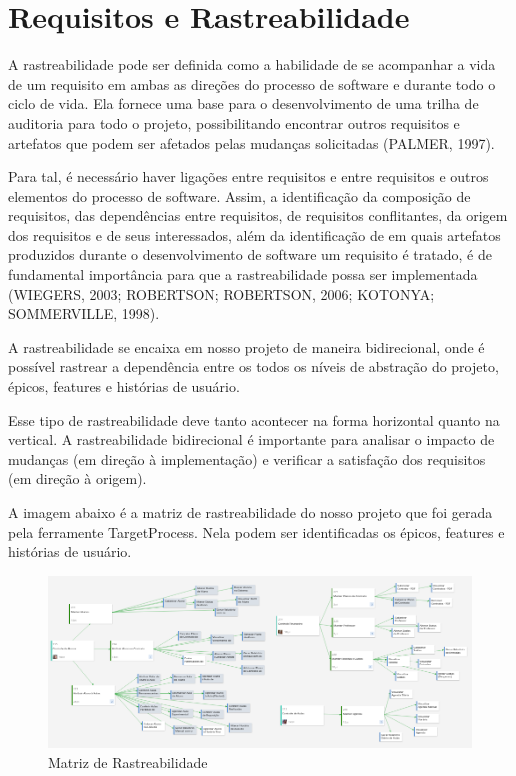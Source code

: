 \section[Requisitos e Rastreabilidade]{Requisitos e Rastreabilidade}
A rastreabilidade pode ser definida como a habilidade de se acompanhar a vida
de um requisito em ambas as direções do processo de software e durante todo o ciclo de
vida. Ela fornece uma base para o desenvolvimento de uma trilha de auditoria para todo
o projeto, possibilitando encontrar outros requisitos e artefatos que podem ser afetados
pelas mudanças solicitadas (PALMER, 1997). 

Para tal, é necessário haver ligações entre requisitos e entre requisitos e outros elementos do processo de software. Assim, a identificação da composição de requisitos, das dependências entre requisitos, de
requisitos conflitantes, da origem dos requisitos e de seus interessados, além da
identificação de em quais artefatos produzidos durante o desenvolvimento de software
um requisito é tratado, é de fundamental importância para que a rastreabilidade possa
ser implementada (WIEGERS, 2003; ROBERTSON; ROBERTSON, 2006;
KOTONYA; SOMMERVILLE, 1998). 

A rastreabilidade se encaixa em nosso projeto de maneira bidirecional, onde é
possível rastrear a dependência entre os todos os níveis de abstração do projeto,
épicos, features e histórias de usuário.

Esse tipo de rastreabilidade deve tanto acontecer na forma horizontal quanto
na vertical. A rastreabilidade bidirecional é importante para analisar o impacto
de mudanças (em direção à implementação) e verificar a satisfação dos
requisitos (em direção à origem).

A imagem abaixo é a matriz de rastreabilidade do nosso projeto que foi gerada pela ferramente TargetProcess. Nela podem ser identificadas os épicos, features e histórias de usuário.

\begin{figure}[!htb]
    \centering
    \includegraphics[width=1.5\textwidth, angle=-90]{figuras/matriz_rastreabilidade.png}
    \caption{Matriz de Rastreabilidade}
    \label{fig:matriz_rastreabilidade}
\end{figure}
